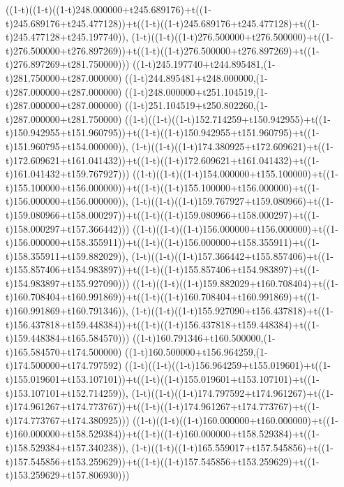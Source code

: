 ((1-t)((1-t)((1-t)248.000000+t245.689176)+t((1-t)245.689176+t245.477128))+t((1-t)((1-t)245.689176+t245.477128)+t((1-t)245.477128+t245.197740)),                                     (1-t)((1-t)((1-t)276.500000+t276.500000)+t((1-t)276.500000+t276.897269))+t((1-t)((1-t)276.500000+t276.897269)+t((1-t)276.897269+t281.750000)))
((1-t)245.197740+t244.895481,(1-t)281.750000+t287.000000)
((1-t)244.895481+t248.000000,(1-t)287.000000+t287.000000)
((1-t)248.000000+t251.104519,(1-t)287.000000+t287.000000)
((1-t)251.104519+t250.802260,(1-t)287.000000+t281.750000)
((1-t)((1-t)((1-t)152.714259+t150.942955)+t((1-t)150.942955+t151.960795))+t((1-t)((1-t)150.942955+t151.960795)+t((1-t)151.960795+t154.000000)),                                     (1-t)((1-t)((1-t)174.380925+t172.609621)+t((1-t)172.609621+t161.041432))+t((1-t)((1-t)172.609621+t161.041432)+t((1-t)161.041432+t159.767927)))
((1-t)((1-t)((1-t)154.000000+t155.100000)+t((1-t)155.100000+t156.000000))+t((1-t)((1-t)155.100000+t156.000000)+t((1-t)156.000000+t156.000000)),                                     (1-t)((1-t)((1-t)159.767927+t159.080966)+t((1-t)159.080966+t158.000297))+t((1-t)((1-t)159.080966+t158.000297)+t((1-t)158.000297+t157.366442)))
((1-t)((1-t)((1-t)156.000000+t156.000000)+t((1-t)156.000000+t158.355911))+t((1-t)((1-t)156.000000+t158.355911)+t((1-t)158.355911+t159.882029)),                                     (1-t)((1-t)((1-t)157.366442+t155.857406)+t((1-t)155.857406+t154.983897))+t((1-t)((1-t)155.857406+t154.983897)+t((1-t)154.983897+t155.927090)))
((1-t)((1-t)((1-t)159.882029+t160.708404)+t((1-t)160.708404+t160.991869))+t((1-t)((1-t)160.708404+t160.991869)+t((1-t)160.991869+t160.791346)),                                     (1-t)((1-t)((1-t)155.927090+t156.437818)+t((1-t)156.437818+t159.448384))+t((1-t)((1-t)156.437818+t159.448384)+t((1-t)159.448384+t165.584570)))
((1-t)160.791346+t160.500000,(1-t)165.584570+t174.500000)
((1-t)160.500000+t156.964259,(1-t)174.500000+t174.797592)
((1-t)((1-t)((1-t)156.964259+t155.019601)+t((1-t)155.019601+t153.107101))+t((1-t)((1-t)155.019601+t153.107101)+t((1-t)153.107101+t152.714259)),                                     (1-t)((1-t)((1-t)174.797592+t174.961267)+t((1-t)174.961267+t174.773767))+t((1-t)((1-t)174.961267+t174.773767)+t((1-t)174.773767+t174.380925)))
((1-t)((1-t)((1-t)160.000000+t160.000000)+t((1-t)160.000000+t158.529384))+t((1-t)((1-t)160.000000+t158.529384)+t((1-t)158.529384+t157.340238)),                                     (1-t)((1-t)((1-t)165.559017+t157.545856)+t((1-t)157.545856+t153.259629))+t((1-t)((1-t)157.545856+t153.259629)+t((1-t)153.259629+t157.806930)))
